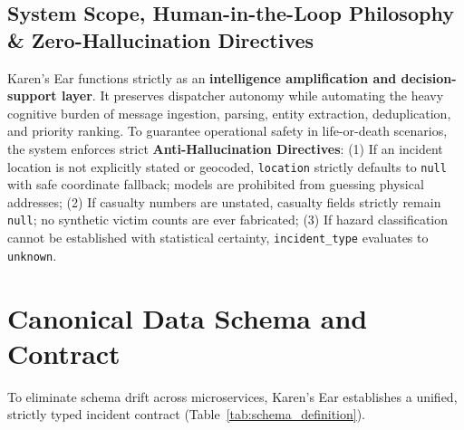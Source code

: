 \documentclass[10pt,a4paper]{article}
\begin{document}
\subsection{System Scope, Human-in-the-Loop Philosophy \& Zero-Hallucination Directives}
Karen's Ear functions strictly as an \textbf{intelligence amplification and decision-support layer}. It preserves dispatcher autonomy while automating the heavy cognitive burden of message ingestion, parsing, entity extraction, deduplication, and priority ranking.
To guarantee operational safety in life-or-death scenarios, the system enforces strict \textbf{Anti-Hallucination Directives}: (1) If an incident location is not explicitly stated or geocoded, \texttt{location} strictly defaults to \texttt{null} with safe coordinate fallback; models are prohibited from guessing physical addresses; (2) If casualty numbers are unstated, casualty fields strictly remain \texttt{null}; no synthetic victim counts are ever fabricated; (3) If hazard classification cannot be established with statistical certainty, \texttt{incident\_type} evaluates to \texttt{unknown}.

\section{Canonical Data Schema and Contract}
To eliminate schema drift across microservices, Karen's Ear establishes a unified, strictly typed incident contract (Table~\ref{tab:schema_definition}).
\end{document}
